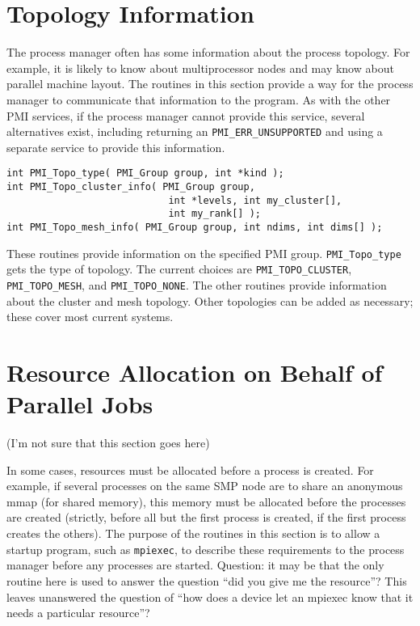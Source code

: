 \documentclass[11pt]{article}
\begin{document}
\section{Topology Information}
\label{sec:topology}
The process manager often has some information about the process
topology.  For example, it is likely to know about multiprocessor
nodes and may know about parallel machine layout.  The routines in
this section provide a way for the process manager to communicate that
information to the program.  As with the other PMI services, if the
process manager cannot provide this service, several alternatives
exist, including returning an \texttt{PMI\_ERR\_UNSUPPORTED} and using
a separate service to provide this information.

\begin{verbatim}
int PMI_Topo_type( PMI_Group group, int *kind );
int PMI_Topo_cluster_info( PMI_Group group, 
                            int *levels, int my_cluster[], 
                            int my_rank[] );
int PMI_Topo_mesh_info( PMI_Group group, int ndims, int dims[] );
\end{verbatim}
These routines provide information on the specified PMI group.
\texttt{PMI\_Topo\_type} gets the type of topology.  The current
choices are \texttt{PMI\_TOPO\_CLUSTER}, \texttt{PMI\_TOPO\_MESH}, and
\texttt{PMI\_TOPO\_NONE}.
The other routines provide information about the cluster and mesh
topology.  Other topologies can be added as necessary; these cover
most current systems.

\section{Resource Allocation on Behalf of Parallel Jobs}
\label{sec:request}
(I'm not sure that this section goes here)

In some cases, resources must be allocated before a process is
created.  For example, if several processes on the same SMP node are
to share an anonymous mmap (for shared memory), this memory must be
allocated before the processes are created (strictly, before all but
the first process is created, if the first process creates the
others).  The purpose of the routines in this section is to allow a
startup program, such as \texttt{mpiexec}, to describe these
requirements to the process manager before  any processes are started.
Question: it may be that the only routine here is used to answer the
question ``did you give me the resource''?  This leaves unanswered the
question of ``how does a device let an mpiexec know that it needs a
particular resource''?
\end{document}
